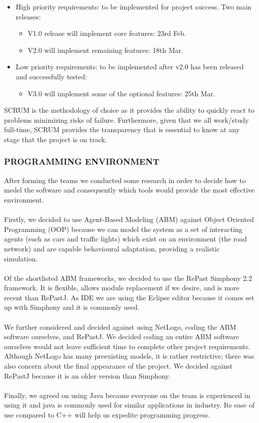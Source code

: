 \documentclass[11pt]{article}
\begin{document}
\begin{itemize}
    \item High priority requirements: to be implemented for project success. Two main releases:
    \begin{itemize}
        \item V1.0 release will implement core features: 23rd Feb.
        \item V2.0 will implement remaining features: 18th Mar.
    \end{itemize}
    \item Low priority requirements: to be implemented after v2.0 has been released and successfully tested:
    \begin{itemize}
        \item V3.0 will implement some of the optional features: 25th Mar.
    \end{itemize}
\end{itemize}
SCRUM is the methodology of choice as it provides the ability to quickly react to problems minimizing risks of failure. Furthermore, given that we all work/study full-time, SCRUM provides the transparency that is essential to know at any stage that the project is on track.


\subsubsection{PROGRAMMING ENVIRONMENT}

After forming the teams we conducted some research in order to decide how to medel the software and consequently which tools would provide the most effective environment.
\\ \\
Firstly, we decided to use Agent-Based Modeling (ABM) against Object Oriented Programming (OOP) because we can model the system as a set of interacting agents (such as cars and traffic lights) which exist on an environment (the road network) and are capable behavioural adaptation, providing a realistic simulation.
\\ \\
Of the shortlisted ABM frameworks, we decided to use the RePast Simphony 2.2 framework. It is flexible, allows module replacement if we desire, and is more recent than RePastJ. As IDE we are using the Eclipse editor because it comes set up with Simphony and it is commonly used.
\\ \\
We further considered and decided against using NetLogo, coding the ABM software ourselves, and RePastJ. 
We decided coding an entire ABM software ourselves would not leave sufficient time to complete other project requirements. Although NetLogo has many preexisting models, it is rather restrictive; there was also concern about the final appearance of the project.
We decided against RePastJ because it is an older version than Simphony.
\\ \\
Finally, we agreed on using Java because everyone on the team is experienced in using it and java is commonly used for similar applications in industry.
Its ease of use compared to C++ will help us expedite programming progress.
\end{document}
